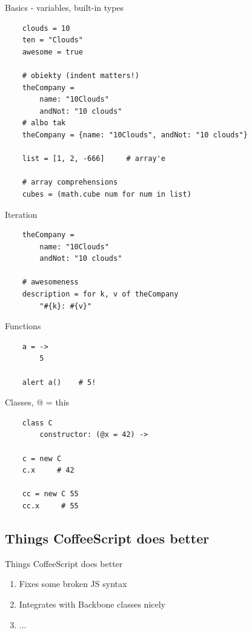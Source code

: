 \documentclass[xcolor=dvipsnames]{beamer}
\newcommand{\slide}[1]{\begin{frame}[fragile]{{#1}}}
\newcommand{\coffee}{\begin{verbatim}}
\begin{document}
\slide{Basics - variables, built-in types}
    
    \coffee
    clouds = 10
    ten = "Clouds"
    awesome = true

    # obiekty (indent matters!)
    theCompany =
        name: "10Clouds"
        andNot: "10 clouds"
    # albo tak
    theCompany = {name: "10Clouds", andNot: "10 clouds"}

    list = [1, 2, -666]     # array'e

    # array comprehensions
    cubes = (math.cube num for num in list)

    \end{verbatim}
\end{frame}

\slide{Iteration}
    
    \coffee
    theCompany =
        name: "10Clouds"
        andNot: "10 clouds"

    # awesomeness
    description = for k, v of theCompany
        "#{k}: #{v}"

    \end{verbatim}
\end{frame}

\slide{Functions}
    
    \coffee
    a = ->
        5

    alert a()    # 5!
    \end{verbatim}
\end{frame}

\slide{Classes, @ = this}
    
    \coffee
    class C
        constructor: (@x = 42) ->

    c = new C
    c.x     # 42

    cc = new C 55
    cc.x     # 55

    \end{verbatim}
\end{frame}


\subsection{Things CoffeeScript does better}
\slide{Things CoffeeScript does better}
    \begin{enumerate}
        \item Fixes some broken JS syntax
        \item Integrates with Backbone classes nicely
        \item ...
    \end{enumerate}
\end{frame}
\end{document}
